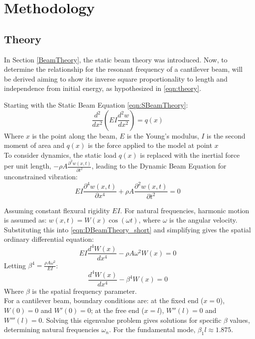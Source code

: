 \documentclass[a4paper,12pt]{article}
\begin{document}
\section{Methodology} \label{Methodology}%

    \subsection{Theory}\label{Theory}%

    In Section \ref{BeamTheory}, the static beam theory was introduced. Now, to determine the relationship for the resonant frequency of a cantilever beam, will be derived aiming to show its inverse square proportionality to length and independence from initial energy, as hypothesized in \eqref{eqn:theory}.

    Starting with the Static Beam Equation \eqref{eqn:SBeamTheory}:
    \begin{equation}\label{eqn:SBeamTheory}
    \frac{d^{2}}{dx^{2}}(EI\frac{d^{2}w}{dx^{2}})=q(x)
    \end{equation}
    Where $x$ is the point along the beam, $E$ is the Young's modulus, $I$ is the second moment of area and $q(x)$ is the force applied to the model at point $x$\\
    To consider dynamics, the static load $q(x)$ is replaced with the inertial force per unit length, $-\rho A \frac{\partial^2 w(x,t)}{\partial t^2}$, leading to the Dynamic Beam Equation for unconstrained vibration:
    \begin{equation}\label{eqn:DBeamTheory_short}
    EI\frac{\partial^{4}w(x,t)}{\partial x^{4}} + \rho A \frac{\partial^2 w(x,t)}{\partial t^2} = 0
    \end{equation}

    Assuming constant flexural rigidity $EI$.  For natural frequencies, harmonic motion is assumed as: $w(x,t) = W(x) \cos(\omega t)$, where $\omega$ is the angular velocity. Substituting this into \eqref{eqn:DBeamTheory_short} and simplifying gives the spatial ordinary differential equation:
    \begin{equation}\label{eqn:SpatialODE_short}
    EI\frac{d^{4}W(x)}{d x^{4}} - \rho A \omega^2 W(x) = 0
    \end{equation}
    Letting $\beta^4 = \frac{\rho A \omega^2}{EI}$:
    \begin{equation}\label{eqn:SpatialODE_simple_short}
    \frac{d^{4}W(x)}{d x^{4}} - \beta^4 W(x) = 0
    \end{equation}
    Where $\beta$ is the spatial frequency parameter.\\
    For a cantilever beam, boundary conditions are: at the fixed end ($x=0$), $W(0) = 0$ and $W'(0) = 0$; at the free end ($x=l$), $W''(l) = 0$ and $W'''(l) = 0$. Solving this eigenvalue problem gives solutions for specific $\beta$ values, determining natural frequencies $\omega_n$.  For the fundamental mode, $\beta_1 l \approx 1.875$.
\end{document}
